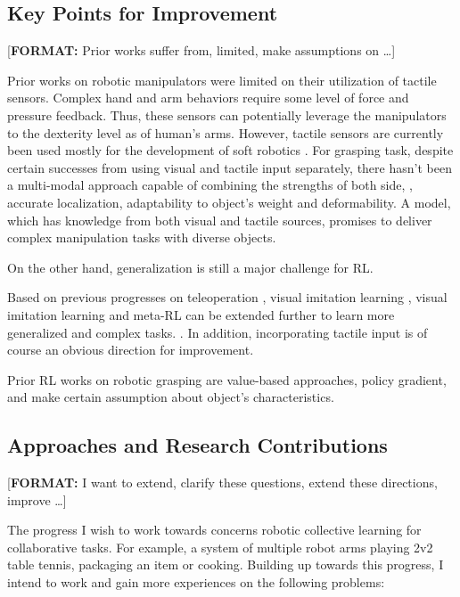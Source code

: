 \subsection{Key Points for Improvement}
[\textbf{FORMAT:} Prior works suffer from, limited, make assumptions on \dots]

Prior works on robotic manipulators were limited on their utilization of tactile sensors. Complex hand and arm behaviors require some level of force and pressure feedback. Thus, these sensors can potentially leverage the manipulators to the dexterity level as of human's arms. However, tactile sensors are currently been used mostly for the development of soft robotics \cite{haddadin2018tactile}. For grasping task, despite certain successes from using visual and tactile input separately, there hasn't been a multi-modal approach capable of combining the strengths of both side, \ie, accurate localization, adaptability to object's weight and deformability. A model, which has knowledge from both visual and tactile sources, promises to deliver complex manipulation tasks with diverse objects.

On the other hand, generalization is still a major challenge for \ac{RL}. 

Based on previous progresses on teleoperation \cite{handa2020dexpilot}, visual imitation learning \cite{finn2017one, sharma2019third}, visual imitation learning and meta-\ac{RL} can be extended further to learn more generalized and complex tasks. . In addition, incorporating tactile input is of course an obvious direction for improvement.

Prior \ac{RL} works on robotic grasping are value-based approaches, policy gradient, and make certain assumption about object's characteristics. \cite{li2019review}

\subsection{Approaches and Research Contributions}
[\textbf{FORMAT:} I want to extend, clarify these questions, extend these directions, improve \dots]

The progress I wish to work towards concerns robotic collective learning for collaborative tasks. For example, a system of multiple robot arms playing 2v2 table tennis, packaging an item or cooking. Building up towards this progress, I intend to work and gain more experiences on the following problems:

